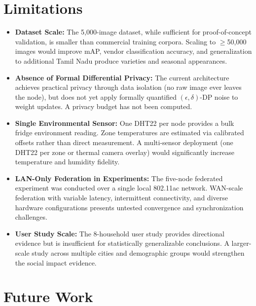 \documentclass[12pt,a4paper]{report}
\begin{document}
\section{Limitations}

\begin{itemize}[leftmargin=2em, itemsep=0.3em]
    \item \textbf{Dataset Scale:} The 5,000-image dataset, while sufficient for proof-of-concept validation, is smaller than commercial training corpora. Scaling to $\geq$50,000 images would improve mAP, vendor classification accuracy, and generalization to additional Tamil Nadu produce varieties and seasonal appearances.
    \item \textbf{Absence of Formal Differential Privacy:} The current architecture achieves practical privacy through data isolation (no raw image ever leaves the node), but does not yet apply formally quantified $(\epsilon, \delta)$-DP noise to weight updates. A privacy budget has not been computed.
    \item \textbf{Single Environmental Sensor:} One DHT22 per node provides a bulk fridge environment reading. Zone temperatures are estimated via calibrated offsets rather than direct measurement. A multi-sensor deployment (one DHT22 per zone or thermal camera overlay) would significantly increase temperature and humidity fidelity.
    \item \textbf{LAN-Only Federation in Experiments:} The five-node federated experiment was conducted over a single local 802.11ac network. WAN-scale federation with variable latency, intermittent connectivity, and diverse hardware configurations presents untested convergence and synchronization challenges.
    \item \textbf{User Study Scale:} The 8-household user study provides directional evidence but is insufficient for statistically generalizable conclusions. A larger-scale study across multiple cities and demographic groups would strengthen the social impact evidence.
\end{itemize}

\section{Future Work}
\end{document}
